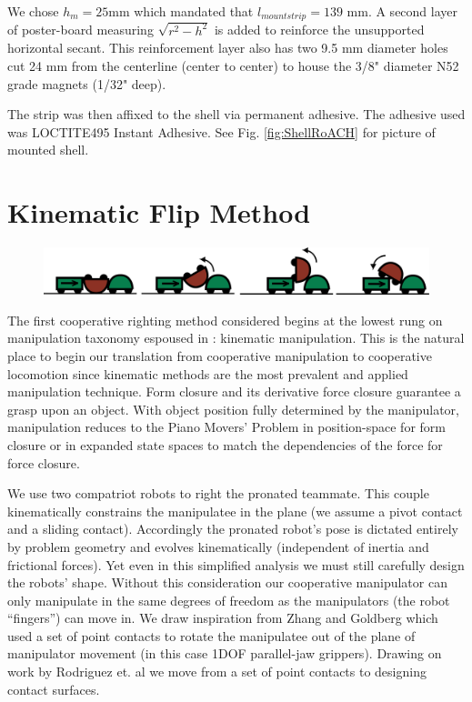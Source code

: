 \documentclass[letterpaper]{report}
\begin{document}
We chose $h_m = 25$mm which mandated that $l_{mountstrip} = 139$ mm.
A second layer of poster-board measuring $\sqrt{r^2-h^2}$ is added to reinforce the unsupported horizontal secant.
This reinforcement layer also has two 9.5 mm diameter holes cut 24 mm from the centerline (center to center) to house the 3/8" diameter N52 grade magnets (1/32" deep).

The strip was then affixed to the shell via permanent adhesive. The adhesive used was LOCTITE495 Instant Adhesive.
See Fig. \ref{fig:ShellRoACH} for picture of mounted shell.





\chapter{Kinematic Flip Method}
\begin{figure}[ht]
\centering
\includegraphics[width=1.0\textwidth]{Kinematic_CoopCartoon.png}
\end{figure}

The first cooperative righting method considered begins at the lowest rung on manipulation taxonomy espoused in \cite{MasonMORMBook}: kinematic manipulation.
This is the natural place to begin our translation from cooperative manipulation to cooperative locomotion since kinematic methods are the most prevalent and applied manipulation technique.
Form closure and its derivative force closure guarantee a grasp upon an object.
With object position fully determined by the manipulator, manipulation reduces to the Piano Movers' Problem in position-space for form closure or in expanded state spaces to match the dependencies of the force for force closure.

We use two compatriot robots to right the pronated teammate. This couple kinematically constrains the manipulatee in the plane (we assume a pivot contact and a sliding contact).
Accordingly the pronated robot's pose is dictated entirely by problem geometry and evolves kinematically (independent of inertia and frictional forces).
Yet even in this simplified analysis we must still carefully design the robots' shape. Without this consideration our cooperative manipulator can only manipulate in the same degrees of freedom as the manipulators (the robot ``fingers'') can move in.
We draw inspiration from Zhang and Goldberg \cite{zhang2002gripper} which used a set of point contacts to rotate the manipulatee out of the plane of manipulator movement (in this case 1DOF parallel-jaw grippers).
Drawing on work by Rodriguez et. al \cite{rodriguez2013effector} we move from a set of point contacts to designing contact surfaces.
\end{document}
